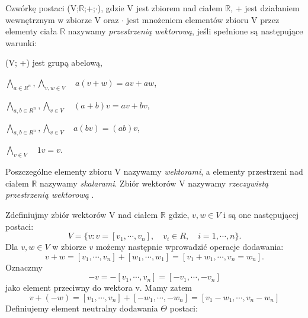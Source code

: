 Czwórkę postaci (V;$\mathbb{R}$;+;$\cdot$), gdzie V jest zbiorem nad ciałem $\mathbb{R}$, + jest działaniem wewnętrznym w zbiorze V oraz $\cdot$ jest mnożeniem elementów zbioru V przez elementy ciała $\mathbb{R}$ nazywamy \textit{przestrzenią wektorową}, jeśli spełnione są następujące warunki:
\begin{axioms}
\item \label{} (V; +) jest grupą abelową,
\item \label{item:L2} \quad $\bigwedge_{a \in R^{n}}, \bigwedge_{v, w \in V} \quad  a(v+w) = av +aw$,
  
  \item \label{item:L3} $\bigwedge_{a,b \in R^{n}}, \bigwedge_{v \in V} \quad  (a + b)v = av + bv$,
  
  \item \label{item:L4} $\bigwedge_{a,b \in R^{n}}, \bigwedge_{v \in V} \quad  a(bv) = (ab)v$, 
  
  \item \label{item:L5} $\bigwedge_{v \in V} \quad  1v = v$.
  
\end{axioms}

Poszczególne elementy zbioru V nazywamy \textit{wektorami}, a elementy przestrzeni nad ciałem $\mathbb{R}$ nazywamy \textit{skalarami}. Zbiór wektorów V nazywamy \textit{rzeczywistą przestrzenią wektorową} \citep[s. 27]{Rutkowski_2008}.




Zdefiniujmy zbiór wektorów V nad ciałem $\mathbb{R}$ gdzie, $v,w \in V$ i są one następującej postaci:
\begin{equation*}
V = \{v: v = [v_{1},\cdots, v_{n}], \quad v_{i} \in R, \quad i = 1,\cdots,n\}.
\end{equation*}
Dla $v,w \in V$ w zbiorze $v$ możemy następnie wprowadzić operacje dodawania:
\begin{equation*}
    v + w = [v_{1}, \cdots, v_{n}] + [w_{1}, \cdots, w_{1}] 
    = [v_{1} + w_{1}, \cdots, v_{n} = w_{n}].
\end{equation*}
Oznaczmy
\begin{equation*}
    -v = -[v_{1},\cdots,v_{n}] = [-v_{1},\cdots,-v_{n}]
\end{equation*}
jako element przeciwny do wektora v. Mamy zatem
\begin{equation*}
    v + (-w) = [v_{1},\cdots,v_{n}] + [-w_{1},\cdots,-w_{n}]
    = [v_{1}-w_{1},\cdots,v_{n}-w_{n}]
\end{equation*}
Definiujemy element neutralny dodawania $\Theta$ postaci:

